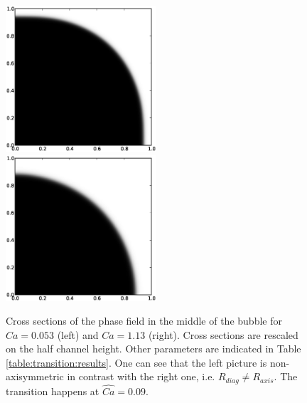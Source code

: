 \documentclass[preprint,12pt]{elsarticle}
\begin{document}
\begin{figure}[ht]
\includegraphics[width=0.5\textwidth]{Figures/phase_crossection_ca5.eps}
\includegraphics[width=0.5\textwidth]{Figures/phase_crossection_ca13.eps}\\
\caption{Cross sections of the phase field in the middle of the bubble for $Ca=0.053$
(left) and $Ca=1.13$ (right). Cross sections are rescaled on the half channel height. Other
parameters are indicated in Table \ref{table:transition:results}. One can see that the left picture
is non-axisymmetric in contrast
with the right one, i.e. $R_{diag}\neq R_{axis}$. The transition happens at
$\widehat{Ca}=0.09$.\label{fig:crosssections:sym}}
\end{figure}
\end{document}
